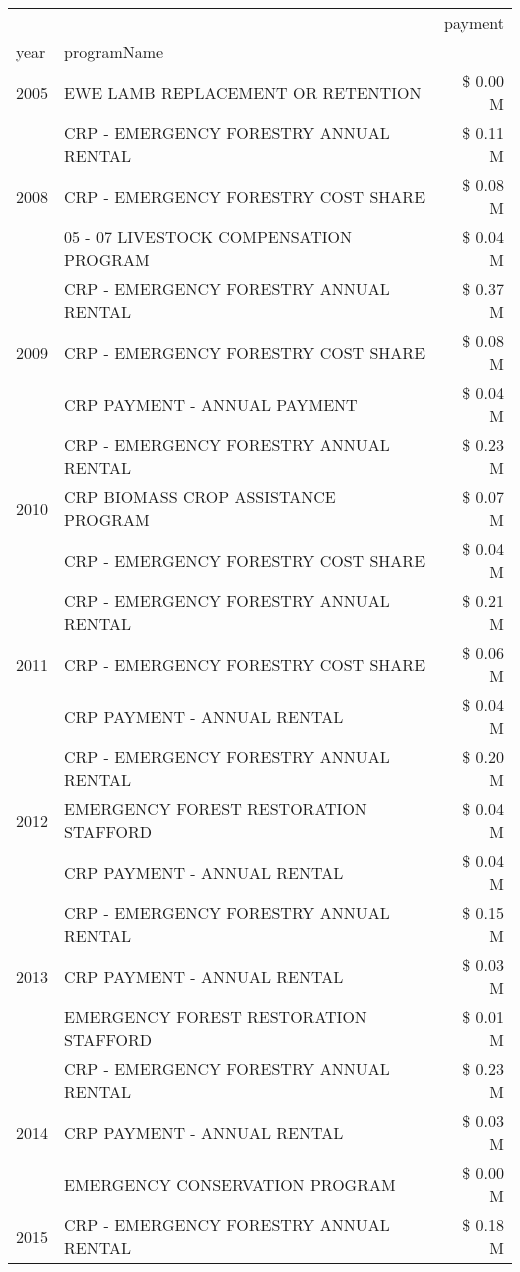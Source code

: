 \begin{tabular}{llr}
\toprule
 &  & payment \\
year & programName &  \\
\midrule
2005 & EWE LAMB REPLACEMENT OR RETENTION & \$ 0.00 M \\
\cline{1-3}
\multirow[t]{3}{*}{2008} & CRP - EMERGENCY FORESTRY ANNUAL RENTAL & \$ 0.11 M \\
 & CRP - EMERGENCY FORESTRY COST SHARE & \$ 0.08 M \\
 & 05 - 07 LIVESTOCK COMPENSATION PROGRAM & \$ 0.04 M \\
\cline{1-3}
\multirow[t]{3}{*}{2009} & CRP - EMERGENCY FORESTRY ANNUAL RENTAL & \$ 0.37 M \\
 & CRP - EMERGENCY FORESTRY COST SHARE & \$ 0.08 M \\
 & CRP PAYMENT - ANNUAL PAYMENT & \$ 0.04 M \\
\cline{1-3}
\multirow[t]{3}{*}{2010} & CRP - EMERGENCY FORESTRY ANNUAL RENTAL & \$ 0.23 M \\
 & CRP BIOMASS CROP ASSISTANCE PROGRAM & \$ 0.07 M \\
 & CRP - EMERGENCY FORESTRY COST SHARE & \$ 0.04 M \\
\cline{1-3}
\multirow[t]{3}{*}{2011} & CRP - EMERGENCY FORESTRY ANNUAL RENTAL & \$ 0.21 M \\
 & CRP - EMERGENCY FORESTRY COST SHARE & \$ 0.06 M \\
 & CRP PAYMENT - ANNUAL RENTAL & \$ 0.04 M \\
\cline{1-3}
\multirow[t]{3}{*}{2012} & CRP - EMERGENCY FORESTRY ANNUAL RENTAL & \$ 0.20 M \\
 & EMERGENCY FOREST RESTORATION STAFFORD & \$ 0.04 M \\
 & CRP PAYMENT - ANNUAL RENTAL & \$ 0.04 M \\
\cline{1-3}
\multirow[t]{3}{*}{2013} & CRP - EMERGENCY FORESTRY ANNUAL RENTAL & \$ 0.15 M \\
 & CRP PAYMENT - ANNUAL RENTAL & \$ 0.03 M \\
 & EMERGENCY FOREST RESTORATION STAFFORD & \$ 0.01 M \\
\cline{1-3}
\multirow[t]{3}{*}{2014} & CRP - EMERGENCY FORESTRY ANNUAL RENTAL & \$ 0.23 M \\
 & CRP PAYMENT - ANNUAL RENTAL & \$ 0.03 M \\
 & EMERGENCY CONSERVATION PROGRAM & \$ 0.00 M \\
\cline{1-3}
\multirow[t]{3}{*}{2015} & CRP - EMERGENCY FORESTRY ANNUAL RENTAL & \$ 0.18 M \\

\end{tabular}
